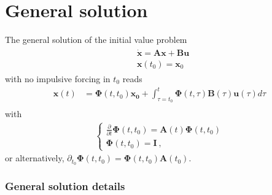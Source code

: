 \documentclass[letterpaper,10pt,english]{jupyterBook}
\begin{document}
\section{General solution}
\label{\detokenize{ch/ode/ode-linear-systems:general-solution}}\label{\detokenize{ch/ode/ode-linear-systems:ode-linear-miscellanea-general-solution}}
\sphinxAtStartPar
The general solution of the initial value problem
\begin{equation}\label{equation:ch/ode/ode-linear-systems:eq:ode:system:linear}
\begin{split}\begin{aligned}
  & \dot{\mathbf{x}} = \mathbf{A} \mathbf{x} + \mathbf{B} \mathbf{u} \\
  & \mathbf{x}(t_0) = \mathbf{x}_0
\end{aligned}\end{split}
\end{equation}
\sphinxAtStartPar
with no impulsive forcing in \(t_0\) reads
\begin{equation}\label{equation:ch/ode/ode-linear-systems:eq:ode:system:linear:sol}
\begin{split}
   \mathbf{x}(t) & = \boldsymbol\Phi(t,t_0) \mathbf{x_0} + \int_{\tau=t_0}^{t}  \boldsymbol\Phi(t,\tau) \mathbf{B}(\tau) \mathbf{u}(\tau) d \tau \\
\end{split}
\end{equation}
\sphinxAtStartPar
with
\begin{equation*}
\begin{split}\begin{cases}
  \frac{\partial}{\partial t} \boldsymbol\Phi(t,t_0) = \mathbf{A}(t) \boldsymbol\Phi(t,t_0) \\
  \boldsymbol\Phi(t,t_0) = \mathbf{I} \ ,
\end{cases}\end{split}
\end{equation*}
\sphinxAtStartPar
or alternatively, \(\partial_{t_0} \boldsymbol\Phi(t,t_0) = \boldsymbol\Phi(t,t_0) \mathbf{A}(t_0)\).
\subsubsection*{General solution \sphinxhyphen{} details}
\end{document}
